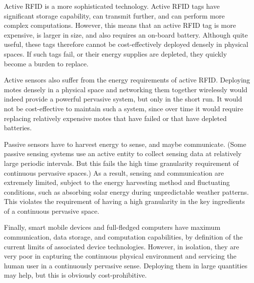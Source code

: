 Active RFID is a more sophisticated technology. Active RFID tags have significant storage capability, can transmit further, and can perform more complex computations. However, this means that an active RFID tag is more expensive, is larger in size, and also requires an on-board battery. Although quite useful, these tags therefore cannot be cost-effectively deployed densely in physical spaces. If such tags fail, or their energy supplies are depleted, they quickly become a burden to replace.

Active sensors also suffer from the energy requirements of active RFID. Deploying motes densely in a physical space and networking them together wirelessly would indeed provide a powerful pervasive system, but only in the short run. It would not be cost-effective to maintain such a system, since over time it would require replacing relatively expensive motes that have failed or that have depleted batteries.

Passive sensors have to harvest energy to sense, and maybe communicate. (Some passive sensing systems use an active entity to collect sensing data at relatively large periodic intervals. But this fails the high time granularity requirement of continuous pervasive spaces.) As a result, sensing and communication are extremely limited, subject to the energy harvesting method and fluctuating conditions, such as absorbing solar energy during unpredictable weather patterns. This violates the requirement of having a high granularity in the key ingredients of a continuous pervasive space.

Finally, smart mobile devices and full-fledged computers have maximum communication, data storage, and computation capabilities, by definition of the current limits of associated device technologies. However, in isolation, they are very poor in capturing the continuous physical environment and servicing the human user in a continuously pervasive sense. Deploying them in large quantities may help, but this is obviously cost-prohibitive.

